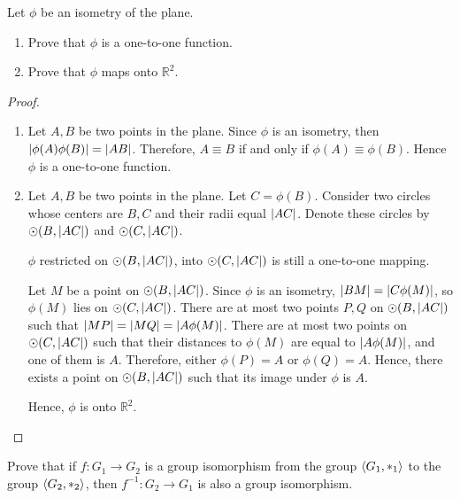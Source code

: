 \begin{exercise}
    Let $\phi$ be an isometry of the plane.
    \begin{enumerate}[label={\textbf{\alph*.}}]
        \item Prove that $\phi$ is a one-to-one function.
        \item Prove that $\phi$ maps onto $\mathbb{R}^{2}$.
    \end{enumerate}
\end{exercise}

\begin{proof}
    \begin{enumerate}[label={\textbf{\alph*.}}]
        \item Let $A, B$ be two points in the plane. Since $\phi$ is an isometry, then $\left\vert{\phi(A)\phi(B)}\right\vert = \left\vert{AB}\right\vert$. Therefore, $A\equiv B$ if and only if $\phi(A)\equiv\phi(B)$. Hence $\phi$ is a one-to-one function.
        \item Let $A, B$ be two points in the plane. Let $C = \phi(B)$. Consider two circles whose centers are $B, C$ and their radii equal $\left\vert{AC}\right\vert$. Denote these circles by $\odot(B, \left\vert{AC}\right\vert)$ and $\odot(C, \left\vert{AC}\right\vert)$.

              $\phi$ restricted on $\odot(B, \left\vert{AC}\right\vert)$, into $\odot(C, \left\vert{AC}\right\vert)$ is still a one-to-one mapping.

              Let $M$ be a point on $\odot(B, \left\vert{AC}\right\vert)$. Since $\phi$ is an isometry, $\left\vert{BM}\right\vert = \left\vert{C\phi(M)}\right\vert$, so $\phi(M)$ lies on $\odot(C, \left\vert{AC}\right\vert)$. There are at most two points $P, Q$ on $\odot(B, \left\vert{AC}\right\vert)$ such that $\left\vert{MP}\right\vert = \left\vert{MQ}\right\vert = \left\vert{A\phi(M)}\right\vert$. There are at most two points on $\odot(C, \left\vert{AC}\right\vert)$ such that their distances to $\phi(M)$ are equal to $\left\vert{A\phi(M)}\right\vert$, and one of them is $A$. Therefore, either $\phi(P) = A$ or $\phi(Q) = A$. Hence, there exists a point on $\odot(B, \left\vert{AC}\right\vert)$ such that its image under $\phi$ is $A$.

              Hence, $\phi$ is onto $\mathbb{R}^{2}$.
    \end{enumerate}
\end{proof}

\begin{exercise}
    Prove that if $f: G_{1} \to G_{2}$ is a group isomorphism from the group $\left\langle{G_{1}, {*}_{1}}\right\rangle$ to the group $\left\langle{G_{2}, {*}_{2}}\right\rangle$, then $f^{-1}: G_{2} \to G_{1}$ is also a group isomorphism.
\end{exercise}

